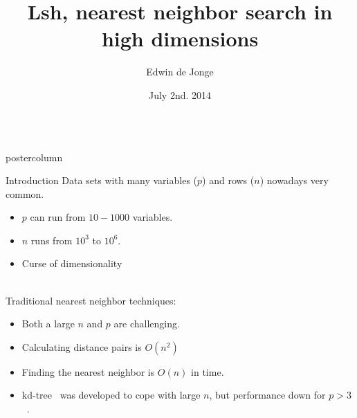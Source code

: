 \documentclass[final,hyperref={pdfpagelabels=false}]{beamer}
\title{\huge Lsh, nearest neighbor search in high dimensions}
\author{Edwin de Jonge}
\institute[Statistics Netherlands]{Methodology Department, Statistics Netherlands, Den Haag, Netherlands}
\date[July. 2nd, 2014]{July 2nd. 2014}
\newlength{\columnheight}
\begin{document}
\begin{frame}[fragile]
  \begin{columns}
    \begin{column}{.49\textwidth}
      \begin{beamercolorbox}[center,wd=\textwidth]{postercolumn}
        \begin{minipage}[T]{.95\textwidth}  %
          \parbox[t][\columnheight]{\textwidth}{ %
            \begin{block}{Introduction}
            Data sets with many variables ($p$) and rows ($n$) nowadays 
            very common. 
            
                \begin{itemize}
                \item $p$ can run from $10-1000$ variables. 
                \item $n$ runs from $10^3$ to $10^6$.
                \item Curse of dimensionality
              \end{itemize}
            
            ~\\
            Traditional nearest neighbor techniques:            
              \begin{itemize}
             \item Both a large $n$ and $p$ are challenging.
             \item Calculating distance pairs is $O(n^2)$ 
             \item Finding the nearest neighbor is $O(n)$ in time.
             \item kd-tree~\citep{bentley1975} was developed to cope with large $n$, but performance
             down for $p > 3$~\citep{datar2004}. 
              \end{itemize}
            

\end{block}}
\end{minipage}
\end{beamercolorbox}
\end{column}
\end{columns}
\end{frame}
\end{document}
